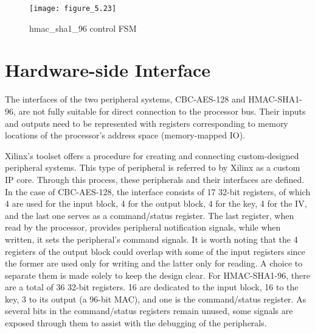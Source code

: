 \begin{figure}
\centering
\texttt{[image: figure\_5.23]}\\
\caption{  hmac\_sha1\_96 control FSM }
\label{fig:figure_5.23}
\end{figure}

\section{Hardware-side Interface}
The interfaces of the two peripheral systems, CBC-AES-128 and HMAC-SHA1-96, are not fully suitable for direct connection to the processor bus. Their inputs and outputs need to be represented with registers corresponding to memory locations of the processor's address space (memory-mapped IO).

Xilinx's toolset offers a procedure for creating and connecting custom-designed peripheral systems. This type of peripheral is referred to by Xilinx as a custom IP core. Through this process, these peripherals and their interfaces are defined. In the case of CBC-AES-128, the interface consists of 17 32-bit registers, of which 4 are used for the input block, 4 for the output block, 4 for the key, 4 for the IV, and the last one serves as a command/status register. The last register, when read by the processor, provides peripheral notification signals, while when written, it sets the peripheral's command signals. It is worth noting that the 4 registers of the output block could overlap with some of the input registers since the former are used only for writing and the latter only for reading. A choice to separate them is made solely to keep the design clear. For HMAC-SHA1-96, there are a total of 36 32-bit registers. 16 are dedicated to the input block, 16 to the key, 3 to its output (a 96-bit MAC), and one is the command/status register. As several bits in the command/status registers remain unused, some signals are exposed through them to assist with the debugging of the peripherals.
